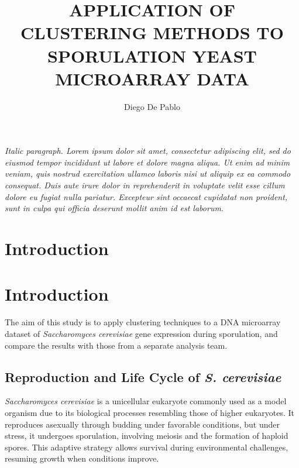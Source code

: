 \documentclass{llncs}
\begin{document}
\title{APPLICATION OF CLUSTERING METHODS TO
	SPORULATION YEAST MICROARRAY DATA}

\author{Diego De Pablo}

\maketitle 

\vspace{1cm} %

\textit{Italic paragraph. Lorem ipsum dolor sit amet, consectetur adipiscing elit, sed do eiusmod tempor incididunt ut labore et dolore magna aliqua. Ut enim ad minim veniam, quis nostrud exercitation ullamco laboris nisi ut aliquip ex ea commodo consequat. Duis aute irure dolor in reprehenderit in voluptate velit esse cillum dolore eu fugiat nulla pariatur. Excepteur sint occaecat cupidatat non proident, sunt in culpa qui officia deserunt mollit anim id est laborum.}



\section{Introduction}

\section*{Introduction}

The aim of this study is to apply clustering techniques to a DNA microarray dataset of \textit{Saccharomyces cerevisiae} gene expression during sporulation, and compare the results with those from a separate analysis team.

\subsection*{Reproduction and Life Cycle of \textit{S. cerevisiae}}

\textit{Saccharomyces cerevisiae} is a unicellular eukaryote commonly used as a model organism due to its biological processes resembling those of higher eukaryotes. It reproduces asexually through budding under favorable conditions, but under stress, it undergoes sporulation, involving meiosis and the formation of haploid spores. This adaptive strategy allows survival during environmental challenges, resuming growth when conditions improve.
\end{document}
